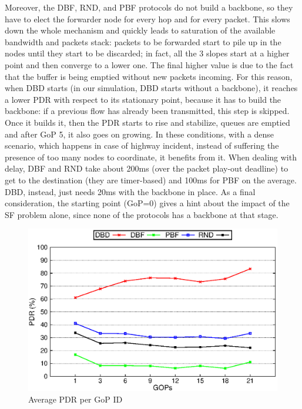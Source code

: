 \documentclass{sig-alternate-2013}
\begin{document}
Moreover, the DBF, RND, and PBF protocols do not build a backbone, so they have to elect the forwarder node for every hop and for every packet. This slows down the whole mechanism and quickly leads to saturation of the available bandwidth and packets stack: packets to be forwarded start to pile up in the nodes until they start to be discarded; in fact, all the 3 slopes start at a higher point and then converge to a lower one. The final higher value is due to the fact that the buffer is being emptied without new packets incoming.
For this reason, when DBD starts (in our simulation, DBD starts without a backbone), it reaches a lower PDR with respect to its stationary point, because it has to build the backbone: if a previous flow has already been transmitted, this step is skipped. Once it builds it, then the PDR starts to rise and stabilize, queues are emptied and after GoP 5, it also goes on growing. In these conditions, with a dense scenario, which happens in case of highway incident, instead of suffering the presence of too many nodes to coordinate, it benefits from it.
When dealing with delay, DBF and RND take about 200ms (over the packet play-out deadline) to get to the destination (they are timer-based) and 100ms for PBF on the average. DBD, instead, just needs 20ms with the backbone in place. As a final consideration, the starting point (GoP=0) gives a hint about the impact of the SF problem alone, since none of the protocols has a backbone at that stage.


\begin{figure}[tb]
\begin{center}
\includegraphics[width=.9\columnwidth]{./fig/selected/LinePDRxGOPIDfinal.eps}
\caption{Average PDR per GoP ID}
\label{fig:qos}
\end{center}
\end{figure}
\end{document}
